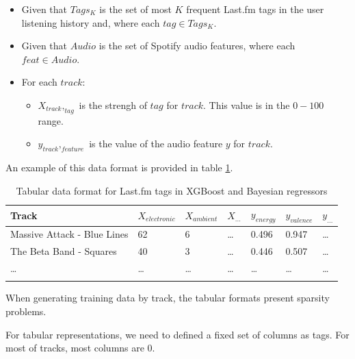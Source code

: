 \documentclass[sn-mathphys]{sn-jnl}%
\theoremstyle{thmstyleone}%
\theoremstyle{thmstyletwo}%
\theoremstyle{thmstylethree}%
\begin{document}
\begin{itemize}
      \item Given that $Tags_{K}$ is the set of most $K$ frequent Last.fm tags in the user listening history
            and, where each $tag \in Tags_{K}$.
      \item Given that $Audio$ is the set of Spotify audio features, where each $feat \in Audio$.
      \item For each $track$:
      \begin{itemize}
            \item $X_{track},_{tag}$ is the strengh of $tag$ for $track$. This value is in the $0-100$ range.
            \item $y_{track},_{feature}$ is the value of the audio feature $y$ for $track$.
      \end{itemize}
\end{itemize}

An example of this data format is provided in table \ref{tabular_tags_format}.

\begin{table}[h]
      \begin{center}
      \begin{minipage}{\textwidth}
      \caption{Tabular data format for Last.fm tags in XGBoost and Bayesian regressors}\label{tabular_tags_format}%
      \begin{tabular}{@{}lllllll@{}}
      \toprule
      Track                         & $X_{electronic}$ & $X_{ambient}$ & $X_{\dots}$ & $y_{energy}$ & $y_{valence}$ & $y_{\dots}$ \\
      \midrule
      Massive Attack - Blue Lines   & 62               & 6             &  \dots      & 0.496        & 0.947         & \dots  \\
      The Beta Band - Squares       & 40               & 3             &  \dots      & 0.446        & 0.507         & \dots  \\
      \dots                         & \dots            & \dots         &  \dots      & \dots        & \dots         & \dots  \\
      \botrule
      \end{tabular}
      \end{minipage}
      \end{center}
\end{table}

When generating training data by track, the tabular formats present sparsity problems.

For tabular representations, we need to defined a fixed set of columns as tags.
For most of tracks, most columns are 0.
\end{document}
